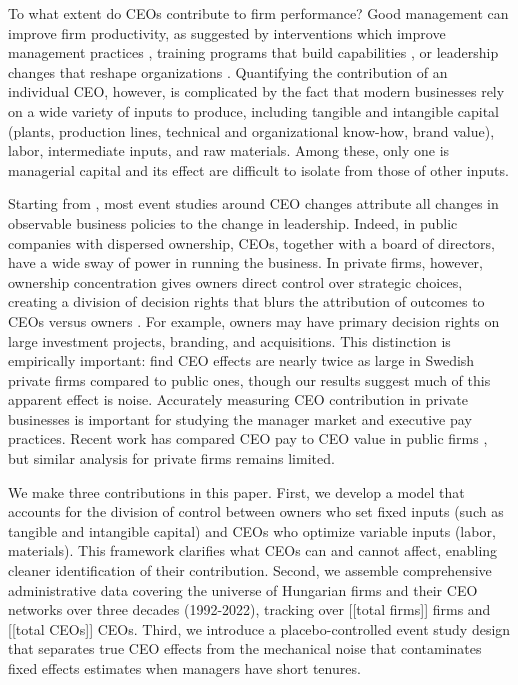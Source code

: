 \documentclass[11pt,a4paper]{article}
\begin{document}
To what extent do CEOs contribute to firm performance? Good management can improve firm productivity, as suggested by interventions which improve management practices \citep{bloom2013does}, training programs that build capabilities \citep{mckenzie2021small}, or leadership changes that reshape organizations \citep{Bertrand2003-io,bennedsen2020ceos,metcalfe2023managers}. Quantifying the contribution of an individual CEO, however, is complicated by the fact that modern businesses rely on a wide variety of inputs to produce, including tangible and intangible capital (plants, production lines, technical and organizational know-how, brand value), labor, intermediate inputs, and raw materials. Among these, only one is managerial capital and its effect are difficult to isolate from those of other inputs.

Starting from \citet{Bertrand2003-io}, most event studies around CEO changes attribute all changes in observable business policies to the change in leadership. Indeed, in public companies with dispersed ownership, CEOs, together with a board of directors, have a wide sway of power in running the business. In private firms, however, ownership concentration gives owners direct control over strategic choices, creating a division of decision rights that blurs the attribution of outcomes to CEOs versus owners \citep{fama1983separation, jensen1976theory, burkart2003family}. For example, owners may have primary decision rights on large investment projects, branding, and acquisitions. This distinction is empirically important: \citet{quigley2022ceo} find CEO effects are nearly twice as large in Swedish private firms compared to public ones, though our results suggest much of this apparent effect is noise. Accurately measuring CEO contribution in private businesses is important for studying the manager market and executive pay practices. Recent work has compared CEO pay to CEO value in public firms \citep{tervio2008difference,gabaix2008ceo}, but similar analysis for private firms remains limited.

We make three contributions in this paper. First, we develop a model that accounts for the division of control between owners who set fixed inputs (such as tangible and intangible capital) and CEOs who optimize variable inputs (labor, materials). This framework clarifies what CEOs can and cannot affect, enabling cleaner identification of their contribution. Second, we assemble comprehensive administrative data covering the universe of Hungarian firms and their CEO networks over three decades (1992-2022), tracking over [[total firms]] firms and [[total CEOs]] CEOs. Third, we introduce a placebo-controlled event study design that separates true CEO effects from the mechanical noise that contaminates fixed effects estimates when managers have short tenures.
\end{document}
